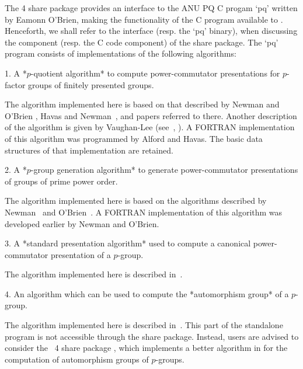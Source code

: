 

The {\GAP} 4 share package {\ANUPQ} provides an interface to the ANU PQ C
progam `pq' written by Eamonn O'Brien, making the functionality of the  C
program available to {\GAP}. Henceforth, we shall refer to  the  {\ANUPQ}
interface (resp. the `pq' binary), when discussing the  {\GAP}  component
(resp. the C code component) of the  {\ANUPQ}  share  package.  The  `pq'
program consists of implementations of the following algorithms:

\beginlist

\item{1.}
A *$p$-quotient algorithm* to compute power-commutator presentations  for
$p$-factor groups of finitely presented groups.

The algorithm implemented here is based on that described by  Newman  and
O'Brien \cite{NO96}, Havas and Newman~\cite{HN80}, and papers referred to
there. Another description of  the  algorithm  is  given  by  Vaughan-Lee
(see~\cite{Vau90a}, \cite{Vau90b}).  A  FORTRAN  implementation  of  this
algorithm was programmed by Alford and Havas. The basic  data  structures
of that implementation are retained.

\item{2.} 
A  *$p$-group  generation   algorithm*   to   generate   power-commutator
presentations of groups of prime power order.

The algorithm implemented here is based on the  algorithms  described  by
Newman~\cite{New77} and O'Brien~\cite{OBr90}. A FORTRAN implementation of
this algorithm was developed earlier by Newman and O'Brien.

\item{3.}
A  *standard  presentation  algorithm*  used  to  compute   a   canonical
power-commutator presentation of a $p$-group.

The algorithm implemented here is described in~\cite{OBr94}.

\item{4.} 
An algorithm which can be used to compute the *automorphism group*  of  a
$p$-group.

The algorithm implemented here is described in~\cite{OBr94}. 
This part of  the  standalone  program  is  not  accessible  through  the
{\ANUPQ} share package.  Instead,  users  are  advised  to  consider  the
{\GAP}~4 share package {\AutPGrp}, which implements a better algorithm in
{\GAP} for the computation of automorphism groups of $p$-groups.

